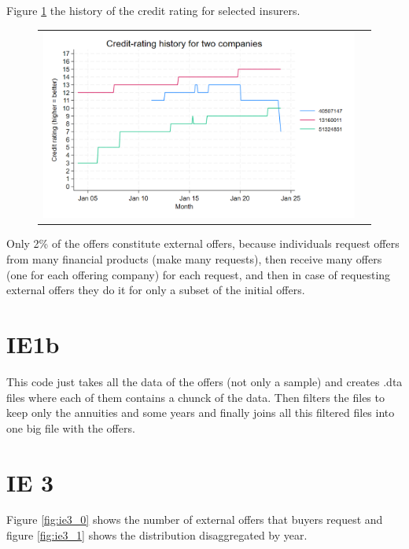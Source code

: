 \documentclass[12pt]{article}
\begin{document}
Figure \ref{fig:ie1_1} the history of the credit rating for selected insurers.  
\begin{figure}[H]
\caption{}
 \label{fig:ie1_1}
\centering{}%
\begin{tabular}{cc}
\includegraphics[scale=0.27]{figures/IE1_credit_history.png}
\end{tabular}
\end{figure}

Only 2\% of the offers constitute external offers, because individuals request offers from many financial products (make many requests), then receive many offers (one for each offering company) for each request, and then in case of requesting external offers they do it for only a subset of the initial offers. 

\section{IE1b}

This code just takes all the data of the offers (not only a sample) and creates .dta files where each of them contains a chunck of the data. Then filters the files to keep only the annuities and some years and finally joins all this filtered files into one big file with the offers. 
 

\section{IE 3}

Figure \ref{fig:ie3_0} shows the number of external offers that buyers request and figure \ref{fig:ie3_1} shows the distribution disaggregated by year. 
\end{document}
